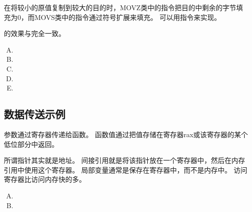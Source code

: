 {{        在将较小的原值复制到较大的目的时，MOVZ类中的指令把目的中剩余的字节填充为0，而MOVS类中的指令通过符号扩展来填充。
        可以用指令来实现。

        的效果与完全一致。

        \begin{practicec}
            \begin{enumerate}[A.]
                \item {}
                \item {}
                \item {}
                \item {}
                \item {}
            \end{enumerate}
        \end{practicec}

        \begin{practicec}

        \end{practicec}
    }

    \subsection{数据传送示例}
    {
        参数通过寄存器传递给函数。
        函数值通过把值存储在寄存器rax或该寄存器的某个低位部分中返回。

        所谓指针其实就是地址。
        间接引用就是将该指针放在一个寄存器中，然后在内存引用中使用这个寄存器。
        局部变量通常是保存在寄存器中，而不是内存中。
        访问寄存器比访问内存快的多。

        \begin{practicec}
            \begin{enumerate}[A.]
                \item {}
                \item
            \end{enumerate}
        \end{practicec}
    }
}
